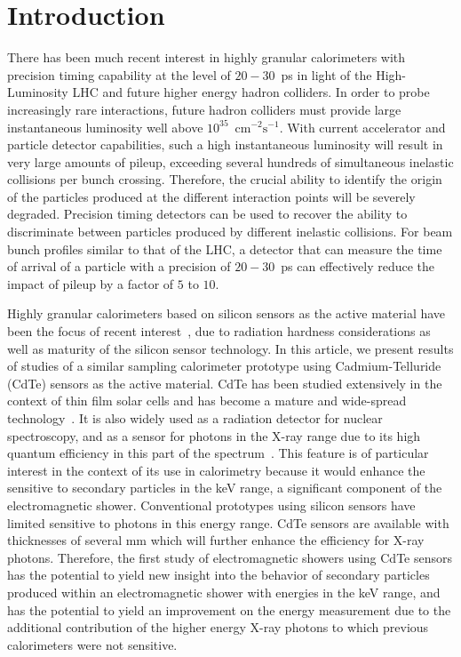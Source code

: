 \section{Introduction} 

There has been much recent interest in highly granular calorimeters with 
precision timing capability at the level of $20-30$~ps in light of the High-Luminosity
LHC and future higher energy hadron colliders. In order to probe increasingly
rare interactions, future hadron colliders must provide large 
instantaneous luminosity well above $10^{35}$~$\mathrm{cm}^{-2}\mathrm{s}^{-1}$.
With current accelerator and particle detector capabilities, such a high 
instantaneous luminosity will result in very large amounts
of pileup, exceeding several hundreds of simultaneous inelastic collisions per
bunch crossing. Therefore, the crucial ability to identify the origin 
of the particles produced at the different interaction points will be severely 
degraded. Precision timing detectors can be used to recover the ability to 
discriminate between particles produced by different inelastic collisions.
For beam bunch profiles similar to that of the LHC, a detector 
that can measure the time of arrival of a particle
with a precision of $20-30$~ps can effectively reduce the impact of
pileup by a factor of $5$ to $10$. 

Highly granular calorimeters based on silicon sensors as the active material 
have been the focus of recent interest~\cite{Adloff:2009,Butler:2020886}, due to
radiation hardness considerations as well as maturity of the silicon sensor
technology. In this article, we present results of studies of a similar
sampling calorimeter prototype using Cadmium-Telluride (CdTe) sensors as the 
active material. CdTe has been studied extensively in the context
of thin film solar cells and has become a mature and wide-spread
technology~\cite{cdtegeneric}. It is also widely used as a radiation
detector for nuclear spectroscopy, and as a sensor for photons in the X-ray range 
due to its high quantum efficiency in this part of the 
spectrum~\cite{cdtesensorsgeneric,cdtesensors1,cdtesensors2,cdtesensors3}.
This feature is of particular interest in the context of its use
in calorimetry because it would enhance the sensitive to secondary particles in the keV range, 
a significant component of the electromagnetic shower. Conventional prototypes 
using silicon sensors have limited sensitive to photons in this energy range. 
CdTe sensors are available with thicknesses of several mm which will further enhance the 
efficiency for X-ray photons.
Therefore, the first study of electromagnetic
showers using CdTe sensors has the potential to yield new insight
into the behavior of secondary particles produced within an 
electromagnetic shower with energies in the keV range, and has the potential
to yield an improvement on the energy measurement due to
the additional contribution of the higher energy X-ray photons to which previous
calorimeters were not sensitive.

